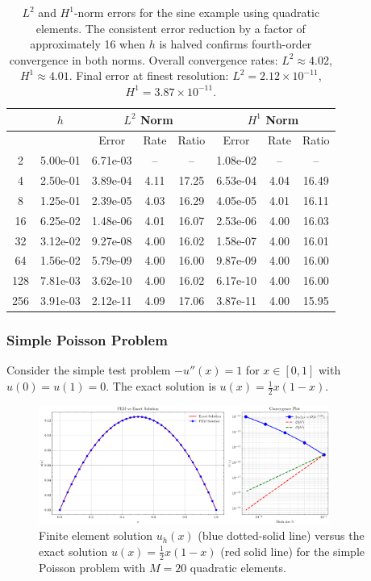 \begin{table}[ht]
	\centering
	\begin{tabular}{|c|c|c|c|c|c|c|c|}
		\hline
		\rowcolor{blue!25!white} 
		\multicolumn{1}{|c|}{$M$} & \multicolumn{1}{c|}{$h$} & \multicolumn{3}{c|}{$L^2$ Norm} & \multicolumn{3}{c|}{$H^1$ Norm} \\
		\hline
		\rowcolor{blue!25!white} 
		& & Error & Rate & Ratio & Error & Rate & Ratio \\
		\hline
		2 & 5.00e-01 & 6.71e-03 & -- & -- & 1.08e-02 & -- & -- \\
		\rowcolor{blue!5!white}
		4 & 2.50e-01 & 3.89e-04 & 4.11 & 17.25 & 6.53e-04 & 4.04 & 16.49 \\
		8 & 1.25e-01 & 2.39e-05 & 4.03 & 16.29 & 4.05e-05 & 4.01 & 16.11 \\
		\rowcolor{blue!5!white}
		16 & 6.25e-02 & 1.48e-06 & 4.01 & 16.07 & 2.53e-06 & 4.00 & 16.03 \\
		32 & 3.12e-02 & 9.27e-08 & 4.00 & 16.02 & 1.58e-07 & 4.00 & 16.01 \\
		\rowcolor{blue!5!white}
		64 & 1.56e-02 & 5.79e-09 & 4.00 & 16.00 & 9.87e-09 & 4.00 & 16.00 \\
		128 & 7.81e-03 & 3.62e-10 & 4.00 & 16.02 & 6.17e-10 & 4.00 & 16.00 \\
		\rowcolor{blue!5!white}
		256 & 3.91e-03 & 2.12e-11 & 4.09 & 17.06 & 3.87e-11 & 4.00 & 15.95 \\
		\hline
	\end{tabular}
	\caption{$L^2$ and $H^1$-norm errors for the sine example using quadratic elements. The consistent error reduction by a factor of approximately 16 when $h$ is halved confirms fourth-order convergence in both norms. Overall convergence rates: $L^2 \approx 4.02$, $H^1 \approx 4.01$. Final error at finest resolution: $L^2 = 2.12 \times 10^{-11}$, $H^1 = 3.87 \times 10^{-11}$.}
	\label{tab:convergence_1}
\end{table}

\subsubsection*{Simple Poisson Problem}
Consider the simple test problem $-u''(x)= 1$ for $x\in [0,1]$ with \(u(0)=u(1)=0\). The exact solution is \(u(x) = \frac{1}{2}x(1-x)\).
\begin{figure}[H]
	\centering
	\includegraphics[width=0.85\textwidth]{figures/fem_plot_convergence_simple_M20.png}
	\caption{Finite element solution \(u_h(x)\) (blue dotted-solid line) versus the exact solution \(u(x)=\frac{1}{2}x(1-x)\) (red solid line) for the simple Poisson problem with \(M=20\) quadratic elements.}
	\label{fig:solution_simple}
\end{figure}
